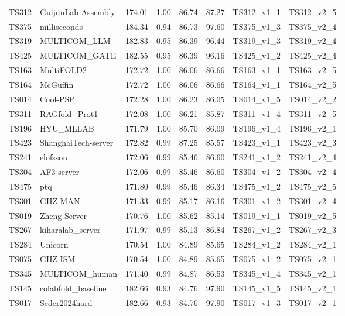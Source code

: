 \begin{longtable}{llllllll}
TS312 & GuijunLab-Assembly & 174.01 & 1.00 & 86.74 & 87.27 & TS312\_v1\_1 & TS312\_v2\_5 \\ 
TS375 & milliseconds & 184.34 & 0.94 & 86.73 & 97.60 & TS375\_v1\_3 & TS375\_v2\_4 \\ 
TS319 & MULTICOM\_LLM & 182.83 & 0.95 & 86.39 & 96.44 & TS319\_v1\_3 & TS319\_v2\_4 \\ 
TS425 & MULTICOM\_GATE & 182.55 & 0.95 & 86.39 & 96.16 & TS425\_v1\_2 & TS425\_v2\_4 \\ 
TS163 & MultiFOLD2 & 172.72 & 1.00 & 86.06 & 86.66 & TS163\_v1\_1 & TS163\_v2\_5 \\ 
TS164 & McGuffin & 172.72 & 1.00 & 86.06 & 86.66 & TS164\_v1\_1 & TS164\_v2\_5 \\ 
TS014 & Cool-PSP & 172.28 & 1.00 & 86.23 & 86.05 & TS014\_v1\_5 & TS014\_v2\_2 \\ 
TS311 & RAGfold\_Prot1 & 172.08 & 1.00 & 86.21 & 85.87 & TS311\_v1\_4 & TS311\_v2\_5 \\ 
TS196 & HYU\_MLLAB & 171.79 & 1.00 & 85.70 & 86.09 & TS196\_v1\_4 & TS196\_v2\_1 \\ 
TS423 & ShanghaiTech-server & 172.82 & 0.99 & 87.25 & 85.57 & TS423\_v1\_1 & TS423\_v2\_3 \\ 
TS241 & elofsson & 172.06 & 0.99 & 85.46 & 86.60 & TS241\_v1\_2 & TS241\_v2\_4 \\ 
TS304 & AF3-server & 172.06 & 0.99 & 85.46 & 86.60 & TS304\_v1\_2 & TS304\_v2\_4 \\ 
TS475 & ptq & 171.80 & 0.99 & 85.46 & 86.34 & TS475\_v1\_2 & TS475\_v2\_5 \\ 
TS301 & GHZ-MAN & 171.33 & 0.99 & 85.17 & 86.16 & TS301\_v1\_2 & TS301\_v2\_4 \\ 
TS019 & Zheng-Server & 170.76 & 1.00 & 85.62 & 85.14 & TS019\_v1\_1 & TS019\_v2\_5 \\ 
TS267 & kiharalab\_server & 171.97 & 0.99 & 85.13 & 86.84 & TS267\_v1\_2 & TS267\_v2\_3 \\ 
TS284 & Unicorn & 170.54 & 1.00 & 84.89 & 85.65 & TS284\_v1\_2 & TS284\_v2\_1 \\ 
TS075 & GHZ-ISM & 170.54 & 1.00 & 84.89 & 85.65 & TS075\_v1\_2 & TS075\_v2\_1 \\ 
TS345 & MULTICOM\_human & 171.40 & 0.99 & 84.87 & 86.53 & TS345\_v1\_4 & TS345\_v2\_1 \\ 
TS145 & colabfold\_baseline & 182.66 & 0.93 & 84.76 & 97.90 & TS145\_v1\_5 & TS145\_v2\_1 \\ 
TS017 & Seder2024hard & 182.66 & 0.93 & 84.76 & 97.90 & TS017\_v1\_3 & TS017\_v2\_1 \\ 

\end{longtable}
